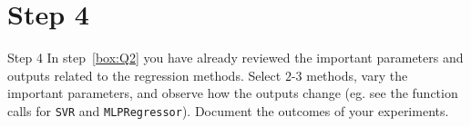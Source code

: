 \section*{Step 4}

\begin{custombox}[label={box:Q4}]{Step 4}
	In step~\ref{box:Q2} you have already reviewed the important parameters and outputs related to the regression methods. Select $2$-$3$ methods, vary the important parameters, and observe how the outputs change (eg. see the function calls for \verb|SVR| and \verb|MLPRegressor|). Document the outcomes of your experiments.
\end{custombox}

\clearpage